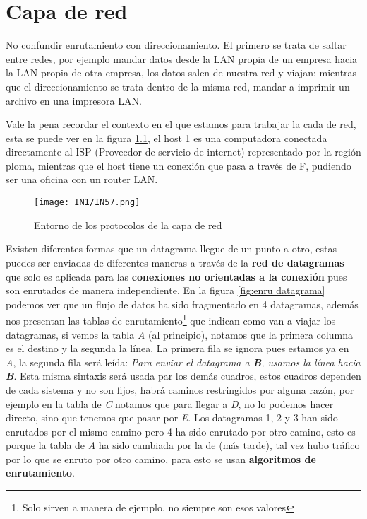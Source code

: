 \documentclass[
	12pt, %
	fleqn, %
	a4paper, %
]{LegrandOrangeBook}
\begin{document}
\chapter{Capa de red}
\begin{remark}
No confundir enrutamiento con direccionamiento. El primero se trata de saltar entre redes, por ejemplo mandar datos desde la LAN propia de un empresa hacia la LAN propia de otra empresa, los datos salen de nuestra red y viajan; mientras que el direccionamiento se trata dentro de la misma red, mandar a imprimir un archivo en una impresora LAN.
\end{remark}
Vale la pena recordar el contexto en el que estamos para trabajar la cada de red, esta se puede ver en la figura \ref{fig:entorno red}, el host 1 es una computadora conectada directamente al ISP (Proveedor de servicio de internet) representado por la región ploma, mientras que el host tiene un conexión que pasa a través de F, pudiendo ser una oficina con un router LAN.
\begin{figure}[]
\centering
\texttt{[image: IN1/IN57.png]}
\caption{Entorno de los protocolos de la capa de red}
\label{fig:entorno red}
\end{figure}
Existen diferentes formas que un datagrama llegue de un punto a otro, estas puedes ser enviadas de diferentes maneras a través de la \textbf{red de datagramas} que solo es aplicada para las \textbf{conexiones no orientadas a la conexión} pues son enrutados de manera independiente. En la figura \ref{fig:enru datagrama} podemos ver que un flujo de datos ha sido fragmentado en 4 datagramas, además nos presentan las tablas de enrutamiento\footnote{Solo sirven a manera de ejemplo, no siempre son esos valores} que indican como van a viajar los datagramas, si vemos la tabla \textit{A} (al principio), notamos que la primera columna es el destino y la segunda la línea. La primera fila se ignora pues estamos ya en \textit{A}, la segunda fila será leída: \emph{Para enviar el datagrama a \textbf{\textit{B}}, usamos la línea hacia \textbf{\textit{B}}}. Esta misma sintaxis será usada par los demás cuadros, estos cuadros dependen de cada sistema y no son fijos, habrá caminos restringidos por alguna razón, por ejemplo en la tabla de \textit{C} notamos que para llegar a \textit{D}, no lo podemos hacer directo, sino que tenemos que pasar por \textit{E}. Los datagramas 1, 2 y 3 han sido enrutados por el mismo camino pero 4 ha sido enrutado por otro camino, esto es porque la tabla de \textit{A} ha sido cambiada por la de (más tarde), tal vez hubo tráfico por lo que se enruto por otro camino, para esto se usan \textbf{algoritmos de enrutamiento}.
\end{document}
